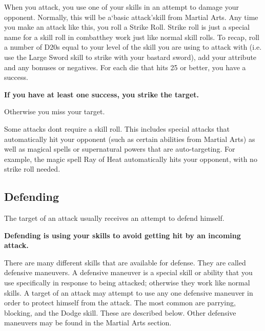 \documentclass[twoside]{book}
\begin{document}
    {  
    When you attack, you use one of your skills in an attempt to damage your opponent. Normally, this will be a`basic attack'skill from Martial Arts. Any time you make an attack like this, you roll a Strike Roll. Strike roll is just a special name for a skill roll in combatthey work just like normal skill rolls. To recap, roll a number of D20s equal to your level of the skill you are using to attack with (i.e. use the Large Sword skill to strike with your bastard sword), add your attribute and any bonuses or negatives. For each die that hits 25 or better, you have a success.

 \textbf{If you have at least one success, you strike the target.}

Otherwise you miss your target.
    }
  
    {  
    Some attacks dont require a skill roll. This includes special attacks that automatically hit your opponent (such as certain abilities from Martial Arts) as well as magical spells or supernatural powers that are auto-targeting. For example, the magic spell Ray of Heat automatically hits your opponent, with no strike roll needed.
    }
  
    

\subsection{Defending}
    
    {  
    The target of an attack usually receives an attempt to defend himself.

 \textbf{Defending is using your skills to avoid getting hit by an incoming attack.}

There are many different skills that are available for defense. They are called defensive maneuvers. A defensive maneuver is a special skill or ability that you use specifically in response to being attacked; otherwise they work like normal skills. A target of an attack may attempt to use any one defensive maneuver in order to protect himself from the attack. The most common are parrying, blocking, and the Dodge skill. These are described below. Other defensive maneuvers may be found in the Martial Arts section.
    }
  
\end{document}
